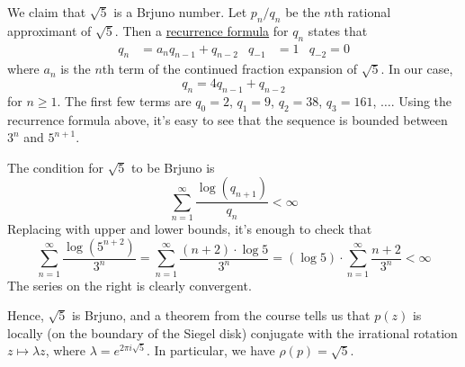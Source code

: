\begin{problem}
\begin{enumerate}[a)]
    We claim that \(\sqrt{5}\) is a Brjuno number. Let \(p_n / q_n\) be the \(n\)th rational approximant of \(\sqrt{5}\). Then a \href{https://en.wikipedia.org/wiki/Continued_fraction#Some_useful_theorems}{recurrence formula} for \(q_n\) states that
    \begin{align*}
        q_n &= a_n q_{n - 1} + q_{n - 2} & q_{-1} &= 1 & q_{-2} = 0
    \end{align*}
    where \(a_n\) is the \(n\)th term of the continued fraction expansion of \(\sqrt{5}\). In our case,
    \[
        q_n = 4 q_{n - 1} + q_{n - 2}
    \]
    for \(n \geq 1\). The first few terms are \(q_0 = 2\), \(q_1 = 9\), \(q_2 = 38\), \(q_3 = 161\), \(\dots\). Using the recurrence formula above, it's easy to see that the sequence is bounded between \(3^n\) and \(5^{n + 1}\).
    
    The condition for \(\sqrt{5}\) to be Brjuno is
    \[
        \sum_{n = 1}^{\infty} \frac{\log \left(q_{n + 1}\right)}{q_n} < \infty
    \]
    Replacing with upper and lower bounds, it's enough to check that
    \[
        \sum_{n = 1}^{\infty} \frac{\log \left(5^{n + 2}\right)}{3^n} = \sum_{n = 1}^{\infty} \frac{(n + 2) \cdot \log 5}{3^n} = (\log 5) \cdot \sum_{n = 1}^{\infty} \frac{n + 2}{3^n} < \infty
    \]
    The series on the right is clearly convergent.
    
    Hence, \(\sqrt{5}\) is Brjuno, and a theorem from the course tells us that \(p(z)\) is locally (on the boundary of the Siegel disk) conjugate with the irrational rotation \(z \mapsto \lambda z\), where \(\lambda = e^{2 \pi i \sqrt{5}}\). In particular, we have \(\rho(p) = \sqrt{5}\).
\end{enumerate}
\end{problem}

